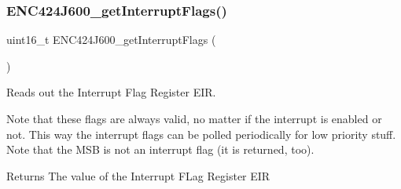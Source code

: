 \subsubsection{\texorpdfstring{ENC424J600\_getInterruptFlags()}{ENC424J600\_getInterruptFlags()}}
{\footnotesize\ttfamily uint16\+\_\+t E\+N\+C424\+J600\+\_\+get\+Interrupt\+Flags (\begin{DoxyParamCaption}{ }\end{DoxyParamCaption})}



Reads out the Interrupt Flag Register E\+IR. 

Note that these flags are always valid, no matter if the interrupt is enabled or not. This way the interrupt flags can be polled periodically for low priority stuff. Note that the M\+SB is not an interrupt flag (it is returned, too). \begin{DoxyReturn}{Returns}
The value of the Interrupt F\+Lag Register E\+IR 
\end{DoxyReturn}
